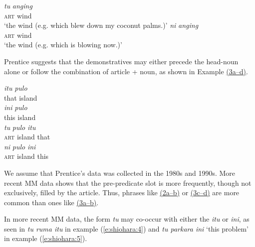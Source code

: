 \documentclass[output=paper
,modfonts
,nonflat]{langsci/langscibook}
\begin{document}
\begin{exe}
	\ex\label{e:shiohara:2}
	\begin{xlist}
		\ex\label{e:shiohara:2a}
		\gll \textit{tu} \textit{anging}\\
		\textsc{art} wind \\
		\glt ‘the wind (e.g. which blew down my coconut palms.)’
		\ex\label{e:shiohara:2b}
		\gll \textit{ni} \textit{anging}\\
		\textsc{art} wind\\
		\glt ‘the wind (e.g. which is blowing now.)’
	\end{xlist}
\end{exe}

\noindent
Prentice suggests that the demonstratives may either precede the head-noun alone or follow the combination of article + noun, as shown in Example \hyperref[e:shiohara:3a]{(3a--d)}.

\begin{exe}
	\label{e:shiohara:3}
	\begin{xlist}
		\ex\label{e:shiohara:3a}
		\gll \textit{itu} \textit{pulo}\\
		that  island\\
		\ex\label{e:shiohara:3b}
		\gll  \textit{ini} \textit{pulo}\\
		this  island\\
		\ex\label{e:shiohara:3c}
		\gll \textit{tu} \textit{pulo} \textit{itu}\\
		\textsc{art}  island  that\\
		\ex\label{e3d}
		\gll \textit{ni} \textit{pulo} \textit{ini}\\
		\textsc{art}  island  this\\
	\end{xlist}
\end{exe}

\noindent
We assume that Prentice’s data was collected in the 1980s and 1990s. More recent MM data shows that the pre-predicate slot is more frequently, though not exclusively, filled by the article. Thus, phrases like \hyperref[e:shiohara:2a]{(2a--b)} or \hyperref[e:shiohara:3c]{(3c--d)} are more common than ones like \hyperref[e:shiohara:3a]{(3a--b)}.

In more recent MM data, the form \textit{tu} may co-occur with either the  \textit{itu} or \textit{ini}, as seen in \textit{tu ruma itu} in example (\ref{e:shiohara:4}) and \textit{tu parkara ini} ‘this problem’ in example (\ref{e:shiohara:5}).
\end{document}

